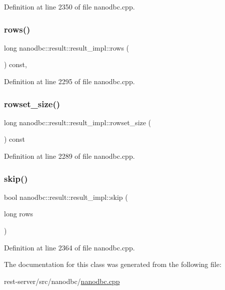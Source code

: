 Definition at line 2350 of file nanodbc.\+cpp.

\mbox{\label{classnanodbc_1_1result_1_1result__impl_a5b821a102ab998eb887155be94f773d7}} 
\subsubsection{\texorpdfstring{rows()}{rows()}}
{\footnotesize\ttfamily long nanodbc\+::result\+::result\+\_\+impl\+::rows (\begin{DoxyParamCaption}{ }\end{DoxyParamCaption}) const\hspace{0.3cm}{\ttfamily [inline]}, {\ttfamily [noexcept]}}



Definition at line 2295 of file nanodbc.\+cpp.

\mbox{\label{classnanodbc_1_1result_1_1result__impl_ae924690b96c815adbf9979baba029e69}} 
\subsubsection{\texorpdfstring{rowset\_size()}{rowset\_size()}}
{\footnotesize\ttfamily long nanodbc\+::result\+::result\+\_\+impl\+::rowset\+\_\+size (\begin{DoxyParamCaption}{ }\end{DoxyParamCaption}) const\hspace{0.3cm}{\ttfamily [inline]}}



Definition at line 2289 of file nanodbc.\+cpp.

\mbox{\label{classnanodbc_1_1result_1_1result__impl_a911cb068bf7048e2735449909605dd71}} 
\subsubsection{\texorpdfstring{skip()}{skip()}}
{\footnotesize\ttfamily bool nanodbc\+::result\+::result\+\_\+impl\+::skip (\begin{DoxyParamCaption}\item[{long}]{rows }\end{DoxyParamCaption})\hspace{0.3cm}{\ttfamily [inline]}}



Definition at line 2364 of file nanodbc.\+cpp.



The documentation for this class was generated from the following file\+:\begin{DoxyCompactItemize}
\item 
rest-\/server/src/nanodbc/\mbox{\hyperlink{nanodbc_8cpp}{nanodbc.\+cpp}}\end{DoxyCompactItemize}
